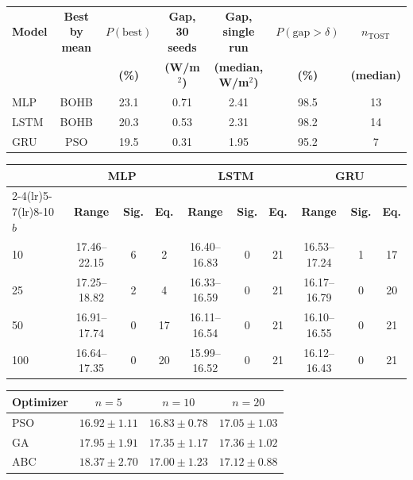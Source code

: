 \begin{tabular}{lcccccc}
\toprule
\textbf{Model} & \textbf{Best by mean} & $P(\text{best})$ & \textbf{Gap, 30 seeds} & \textbf{Gap, single run} & $P(\text{gap}>\delta)$ & $n_{\text{TOST}}$ \\
 & & \textbf{(\%)} & \textbf{(W/m$^2$)} & \textbf{(median, W/m$^2$)} & \textbf{(\%)} & \textbf{(median)} \\
\midrule
MLP & BOHB & 23.1 & 0.71 & 2.41 & 98.5 & 13 \\
LSTM & BOHB & 20.3 & 0.53 & 2.31 & 98.2 & 14 \\
GRU & PSO & 19.5 & 0.31 & 1.95 & 95.2 & 7 \\
\bottomrule
\end{tabular}

\begin{tabular}{lccccccccc}
\toprule
 & \multicolumn{3}{c}{\textbf{MLP}} & \multicolumn{3}{c}{\textbf{LSTM}} & \multicolumn{3}{c}{\textbf{GRU}} \\
\cmidrule(lr){2-4}\cmidrule(lr){5-7}\cmidrule(lr){8-10}
$b$ & \textbf{Range} & \textbf{Sig.} & \textbf{Eq.} & \textbf{Range} & \textbf{Sig.} & \textbf{Eq.} & \textbf{Range} & \textbf{Sig.} & \textbf{Eq.} \\
\midrule
10 & 17.46--22.15 & 6 & 2 & 16.40--16.83 & 0 & 21 & 16.53--17.24 & 1 & 17 \\
25 & 17.25--18.82 & 2 & 4 & 16.33--16.59 & 0 & 21 & 16.17--16.79 & 0 & 20 \\
50 & 16.91--17.74 & 0 & 17 & 16.11--16.54 & 0 & 21 & 16.10--16.55 & 0 & 21 \\
100 & 16.64--17.35 & 0 & 20 & 15.99--16.52 & 0 & 21 & 16.12--16.43 & 0 & 21 \\
\bottomrule
\end{tabular}

\begin{tabular}{lccc}
\toprule
\textbf{Optimizer} & $n=5$ & $n=10$ & $n=20$ \\
\midrule
PSO & $16.92 \pm 1.11$ & $16.83 \pm 0.78$ & $17.05 \pm 1.03$ \\
GA & $17.95 \pm 1.91$ & $17.35 \pm 1.17$ & $17.36 \pm 1.02$ \\
ABC & $18.37 \pm 2.70$ & $17.00 \pm 1.23$ & $17.12 \pm 0.88$ \\
\bottomrule
\end{tabular}


